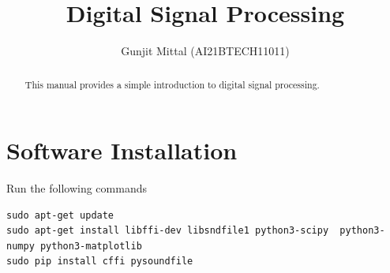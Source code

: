 \documentclass[journal,12pt,twocolumn]{IEEEtran}
\renewcommand\thesection{\arabic{section}}
\begin{document}
\providecommand{\dec}[2]{\ensuremath{\overset{#1}{\underset{#2}{\gtrless}}}}
\newcommand{\myvec}[1]{\ensuremath{\begin{pmatrix}#1\end{pmatrix}}}
\newcommand{\mydet}[1]{\ensuremath{\begin{vmatrix}#1\end{vmatrix}}}
\makeatletter
{} 
\makeatother
\let\StandardTheFigure\thefigure{} 
\let\vec\mathbf{}
\def\putbox#1#2#3{\makebox[0in][l]{\makebox[#1][l]{}\raisebox{\baselineskip}[0in][0in]{\raisebox{#2}[0in][0in]{#3}}}}
     \def\rightbox#1{\makebox[0in][r]{#1}}
     \def\centbox#1{\makebox[0in]{#1}}
     \def\topbox#1{\raisebox{-\baselineskip}[0in][0in]{#1}}
     \def\midbox#1{\raisebox{-0.5\baselineskip}[0in][0in]{#1}}
\vspace{3cm}
\title{Digital Signal Processing}
\author{Gunjit Mittal (AI21BTECH11011)}
\maketitle
\tableofcontents 
\renewcommand{\thefigure}{\theenumi}
\renewcommand{\thetable}{\theenumi}
\bigskip
\begin{abstract}
This manual provides a simple introduction to digital signal processing.
\end{abstract}
\section{Software Installation}
Run the following commands
\begin{lstlisting}
sudo apt-get update
sudo apt-get install libffi-dev libsndfile1 python3-scipy  python3-numpy python3-matplotlib 
sudo pip install cffi pysoundfile 
\end{lstlisting}
\end{document}
